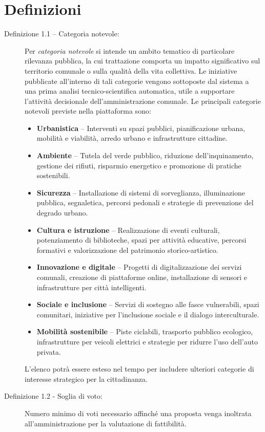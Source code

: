 \section{Definizioni}

\begin{description}
  \item[Definizione 1.1 – Categoria notevole:] 
  Per \textit{categoria notevole} si intende un ambito tematico di particolare rilevanza pubblica, la cui trattazione comporta un impatto significativo sul territorio comunale o sulla qualità della vita collettiva.  
  Le iniziative pubblicate all’interno di tali categorie vengono sottoposte dal sistema a una prima analisi tecnico-scientifica automatica, utile a supportare l’attività decisionale dell’amministrazione comunale.  
  Le principali categorie notevoli previste nella piattaforma sono:
  \begin{itemize}
    \item \textbf{Urbanistica} – Interventi su spazi pubblici, pianificazione urbana, mobilità e viabilità, arredo urbano e infrastrutture cittadine.
    \item \textbf{Ambiente} – Tutela del verde pubblico, riduzione dell’inquinamento, gestione dei rifiuti, risparmio energetico e promozione di pratiche sostenibili.
    \item \textbf{Sicurezza} – Installazione di sistemi di sorveglianza, illuminazione pubblica, segnaletica, percorsi pedonali e strategie di prevenzione del degrado urbano.
    \item \textbf{Cultura e istruzione} – Realizzazione di eventi culturali, potenziamento di biblioteche, spazi per attività educative, percorsi formativi e valorizzazione del patrimonio storico-artistico.
    \item \textbf{Innovazione e digitale} – Progetti di digitalizzazione dei servizi comunali, creazione di piattaforme online, installazione di sensori e infrastrutture per città intelligenti.
    \item \textbf{Sociale e inclusione} – Servizi di sostegno alle fasce vulnerabili, spazi comunitari, iniziative per l’inclusione sociale e il dialogo interculturale.
    \item \textbf{Mobilità sostenibile} – Piste ciclabili, trasporto pubblico ecologico, infrastrutture per veicoli elettrici e strategie per ridurre l’uso dell’auto privata.
  \end{itemize}
  L’elenco potrà essere esteso nel tempo per includere ulteriori categorie di interesse strategico per la cittadinanza.
  
  \vspace{1em}
  \item[Definizione 1.2 - Soglia di voto:] Numero minimo di voti necessario affinché una proposta venga inoltrata all’amministrazione per la valutazione di fattibilità.
\end{description}

